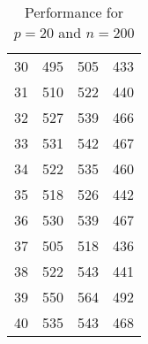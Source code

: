 \begin{table}
{\begin{tabular}{|c|c|c|c|}
30 & 495 & 505 & 433 \\
31 & 510 & 522 & 440 \\
32 & 527 & 539 & 466 \\
33 & 531 & 542 & 467 \\
34 & 522 & 535 & 460 \\
35 & 518 & 526 & 442 \\
36 & 530 & 539 & 467 \\
37 & 505 & 518 & 436 \\
38 & 522 & 543 & 441 \\
39 & 550 & 564 & 492 \\
40 & 535 & 543 & 468 \\
\hline
\end{tabular}
\caption{Performance for $p=20$ and $n=200$}
\label{tab:dat-20}
}
\end{table}

